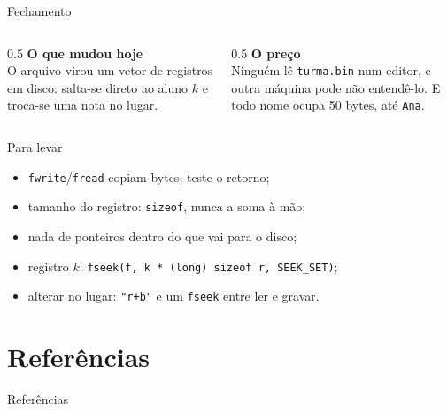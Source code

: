 \documentclass[aspectratio=169]{beamer}
\begin{document}
\begin{frame}{Fechamento}
  \begin{columns}[T]
    \begin{column}{0.5\textwidth}
      \textbf{O que mudou hoje}\\[0.3em]
      \small O arquivo virou um vetor de registros em disco: salta-se
      direto ao aluno $k$ e troca-se uma nota no lugar.
    \end{column}
    \begin{column}{0.5\textwidth}
      \textbf{O preço}\\[0.3em]
      \small Ninguém lê \texttt{turma.bin} num editor, e outra máquina pode
      não entendê-lo. E todo nome ocupa 50 bytes, até \texttt{Ana}.
    \end{column}
  \end{columns}
  \begin{block}{Para levar}
    \begin{itemize}
      \small
      \item \texttt{fwrite}/\texttt{fread} copiam bytes; teste o retorno;
      \item tamanho do registro: \texttt{sizeof}, nunca a soma à mão;
      \item nada de ponteiros dentro do que vai para o disco;
      \item registro $k$: \texttt{fseek(f, k * (long) sizeof r, SEEK\_SET)};
      \item alterar no lugar: \texttt{"r+b"} e um \texttt{fseek} entre ler e
        gravar.
    \end{itemize}
  \end{block}
\end{frame}

\section*{Referências}
\begin{frame}[allowframebreaks]{Referências}
  \nocite{*}
  
  
\end{frame}
\end{document}

